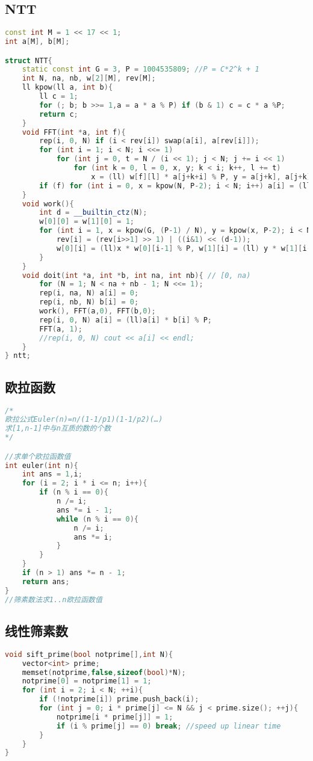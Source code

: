 \subsection{NTT}
\begin{lstlisting}[language=C++]
const int M = 1 << 17 << 1;
int a[M], b[M];

struct NTT{
	static const int G = 3, P = 1004535809; //P = C*2^k + 1
	int N, na, nb, w[2][M], rev[M];
	ll kpow(ll a, int b){
		ll c = 1;
		for (; b; b >>= 1,a = a * a % P) if (b & 1) c = c * a %P;
		return c;
	}
	void FFT(int *a, int f){
		rep(i, 0, N) if (i < rev[i]) swap(a[i], a[rev[i]]);
		for (int i = 1; i < N; i <<= 1)
			for (int j = 0, t = N / (i << 1); j < N; j += i << 1)
				for (int k = 0, l = 0, x, y; k < i; k++, l += t)
					x = (ll) w[f][l] * a[j+k+i] % P, y = a[j+k], a[j+k] = (y+x) % P, a[j+k+i] = (y-x+P) % P;
		if (f) for (int i = 0, x = kpow(N, P-2); i < N; i++) a[i] = (ll)a[i] * x % P;
	}
	void work(){
		int d = __builtin_ctz(N);
		w[0][0] = w[1][0] = 1;
		for (int i = 1, x = kpow(G, (P-1) / N), y = kpow(x, P-2); i < N; i++) {
			rev[i] = (rev[i>>1] >> 1) | ((i&1) << (d-1));
			w[0][i] = (ll)x * w[0][i-1] % P, w[1][i] = (ll) y * w[1][i-1] % P;
		}
	}
	void doit(int *a, int *b, int na, int nb){ // [0, na)
		for (N = 1; N < na + nb - 1; N <<= 1);
		rep(i, na, N) a[i] = 0;
		rep(i, nb, N) b[i] = 0;
		work(), FFT(a,0), FFT(b,0);
		rep(i, 0, N) a[i] = (ll)a[i] * b[i] % P;
		FFT(a, 1);
		//rep(i, 0, N) cout << a[i] << endl;
	}
} ntt;
\end{lstlisting}
\subsection{欧拉函数}
\begin{lstlisting}[language=C++]
/*
欧拉公式Euler(n)=n/(1-1/p1)(1-1/p2)(…)
求[1,n-1]中与n互质的数的个数 
*/ 

//求单个欧拉函数值 
int euler(int n){
	int ans = 1,i;
	for (i = 2; i * i <= n; i++){
		if (n % i == 0){
			n /= i;
			ans *= i - 1;
			while (n % i == 0){
				n /= i;
				ans *= i;
			}
		}
	}
	if (n > 1) ans *= n - 1;
	return ans;
}
//筛素数法求1..n欧拉函数值
\end{lstlisting}
\subsection{线性筛素数}
\begin{lstlisting}[language=C++]
void sift_prime(bool notprime[],int N){
	vector<int> prime; 
	memset(notprime,false,sizeof(bool)*N);
	notprime[0] = notprime[1] = 1;
	for (int i = 2; i < N; ++i){
		if (!notprime[i]) prime.push_back(i);
		for (int j = 0; i * prime[j] <= N && j < prime.size(); ++j){
			notprime[i * prime[j]] = 1;
			if (i % prime[j] == 0) break; //speed up linear time
		}
	}
}
\end{lstlisting}
